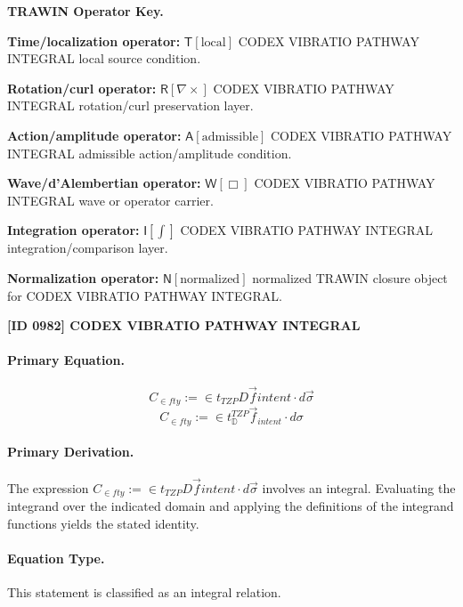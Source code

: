\par\vspace{0.45\baselineskip}
\noindent\begin{minipage}[t]{\linewidth}
\begingroup
\small
\raggedright
\textbf{TRAWIN Operator Key.}\par
\noindent\textbf{Time/localization operator:} $\mathsf{T}\!\left[\mathrm{local}\right]$ CODEX VIBRATIO PATHWAY INTEGRAL local source condition.\par
\noindent\textbf{Rotation/curl operator:} $\mathsf{R}\!\left[\nabla\times\right]$ CODEX VIBRATIO PATHWAY INTEGRAL rotation/curl preservation layer.\par
\noindent\textbf{Action/amplitude operator:} $\mathsf{A}\!\left[\mathrm{admissible}\right]$ CODEX VIBRATIO PATHWAY INTEGRAL admissible action/amplitude condition.\par
\noindent\textbf{Wave/d'Alembertian operator:} $\mathsf{W}\!\left[\Box\right]$ CODEX VIBRATIO PATHWAY INTEGRAL wave or operator carrier.\par
\noindent\textbf{Integration operator:} $\mathsf{I}\!\left[\int\right]$ CODEX VIBRATIO PATHWAY INTEGRAL integration/comparison layer.\par
\noindent\textbf{Normalization operator:} $\mathsf{N}\!\left[\mathrm{normalized}\right]$ normalized TRAWIN closure object for CODEX VIBRATIO PATHWAY INTEGRAL.\par
\endgroup
\end{minipage}

\clearpage
\noindent\textbf{[ID 0982] CODEX VIBRATIO PATHWAY INTEGRAL}\par
\vspace{0.35em}
\paragraph{Primary Equation.}
\[
C_{\in fty} := \in t_{TZP} D \vec{f} {intent} \cdot d\vec{\sigma}
\]
\[
C_{\in fty}:=\in t_{\mathbb{D}}^{TZP}\vec{f}_{intent}\cdot d\sigma
\]

\paragraph{Primary Derivation.}
The expression \( C_{\in fty} := \in t_{TZP} D \vec{f} {intent} \cdot d\vec{\sigma} \) involves an integral. Evaluating the integrand over the indicated domain and applying the definitions of the integrand functions yields the stated identity.
\paragraph{Equation Type.}
This statement is classified as an integral relation.

